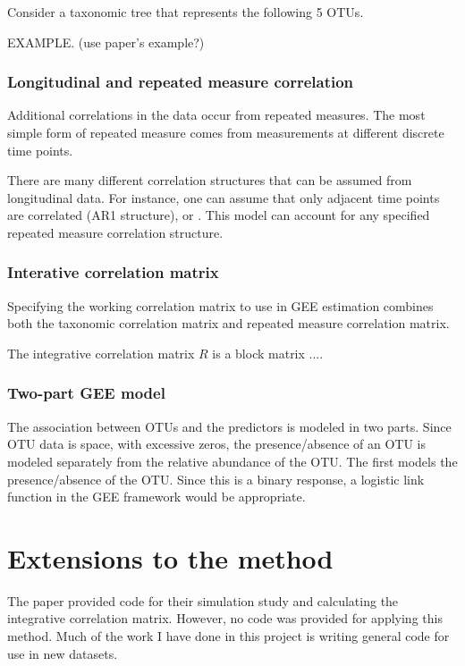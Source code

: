 \documentclass[12pt]{article}
\begin{document}
Consider a taxonomic tree that represents the following 5 OTUs.


EXAMPLE. (use paper's example?)


\subsubsection{Longitudinal and repeated measure correlation}

Additional correlations in the data occur from repeated measures. The most simple form of repeated measure comes from measurements at different discrete time points.

There are many different correlation structures that can be assumed from longitudinal data. For instance, one can assume that only adjacent time points are correlated (AR1 structure), or . This model can account for any specified repeated measure correlation structure.

\subsubsection{Interative correlation matrix }

Specifying the working correlation matrix to use in GEE estimation combines both the taxonomic correlation matrix and repeated measure correlation matrix.

The integrative correlation matrix $R$ is a block matrix ....


\subsubsection{Two-part GEE model}

The association between OTUs and the predictors is modeled in two parts. Since OTU data is space, with excessive zeros, the presence/absence of an OTU is modeled separately from the relative abundance of the OTU.
The first models the presence/absence of the OTU. Since this is a binary response, a logistic link function in the GEE framework would be appropriate.



\section{Extensions to the method}

The paper provided code for their simulation study and calculating the integrative correlation matrix. However, no code was provided for applying this method. Much of the work I have done in this project is writing general code for use in new datasets.
\end{document}
